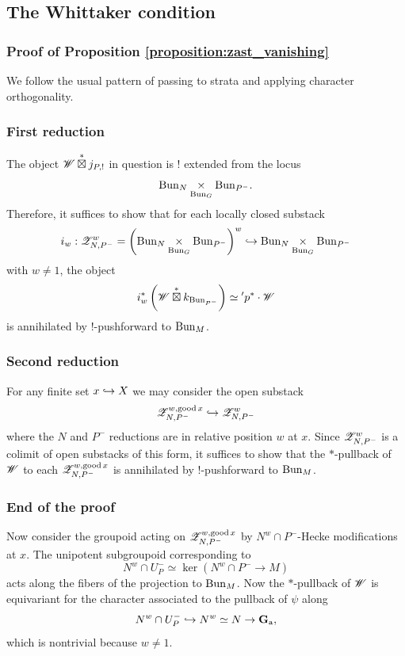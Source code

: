 \subsection{The Whittaker condition}
\label{subsection:Jacquet_Whittaker}

\subsubsection{Proof of Proposition \ref{proposition:zast_vanishing}} We follow the usual pattern of passing to strata and applying character orthogonality.

\subsubsection{First reduction} The object $\mathscr{W} \overset{*}{\boxtimes} j_{P,!}$ in question is $!$ extended from the locus
  \[\mathrm{Bun}_N \underset{\mathrm{Bun}_G}{\times} \mathrm{Bun}_{P^-}.\]
Therefore, it suffices to show that for each locally closed substack
  \[i_w : \mathscr{Z}_{N,P^-}^w = \left( \mathrm{Bun}_N \underset{\mathrm{Bun}_G}{\times} \mathrm{Bun}_{P^-} \right)^w \hookrightarrow \mathrm{Bun}_N \underset{\mathrm{Bun}_G}{\times} \mathrm{Bun}_{P^-}\]
with $w \neq 1$, the object
  \[i_w^* \left( \mathscr{W} \overset{*}{\boxtimes} k_{\mathrm{Bun}_{P^-}} \right) \simeq {'} p^* \cdot \mathscr{W} \]
is annihilated by $!$-pushforward to $\mathrm{Bun}_M$. 

\subsubsection{Second reduction} For any finite set $x \hookrightarrow X$ we may consider the open substack
  \[\mathscr{Z}_{N,P^-}^{w, \mathrm{good}\,x} \hookrightarrow \mathscr{Z}_{N,P^-}^w\]
where the $N$ and $P^-$ reductions are in relative position $w$ at $x$. Since $\mathscr{Z}_{N,P^-}^w$ is a colimit of open substacks of this form, it suffices to show that the $*$-pullback of $\mathscr{W}$ to each $\mathscr{Z}_{N,P^-}^{w, \mathrm{good}\,x}$ is annihilated by $!$-pushforward to $\mathrm{Bun}_M$. 

\subsubsection{End of the proof} Now consider the groupoid acting on $\mathscr{Z}_{N,P^-}^{w, \mathrm{good} \, x}$ by $N^w \cap P^-$-Hecke modifications at $x$. The unipotent subgroupoid corresponding to
    \[N^w \cap U_P^- \simeq \ker\left( N^w \cap P^- \to M \right)\]
acts along the fibers of the projection to $\mathrm{Bun}_M$. Now the $*$-pullback of $\mathscr{W}$ is equivariant for the character associated to the pullback of $\psi$ along
  \[N^w \cap U_P^- \hookrightarrow N^w \simeq N \to \mathbf{G}_{\mathrm{a}},\]
which is nontrivial because $w \neq 1$.

